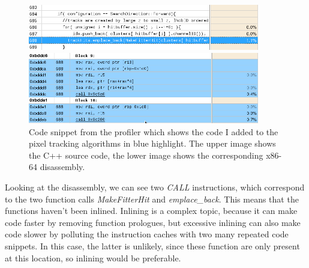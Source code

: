 \documentclass[12pt]{article}
\begin{document}
\begin{figure}[H]
	\begin{center}
		\includegraphics[width=0.9\textwidth]{kalmanfit_disasm_opt_src_naive}
	\end{center}
	\begin{center}
		\includegraphics[width=0.9\textwidth]{kalmanfit_disasm_opt_asm_naive}
	\end{center}
	\caption{Code snippet from the profiler which shows the code I added to the pixel tracking algorithms in blue highlight. The upper image shows the C++ source code, the lower image shows the corresponding x86-64 disassembly.}
	\label{fig_kalman_disasm_src_naive}
\end{figure}

Looking at the disassembly, we can see two \textit{CALL} instructions, which correspond to the two function calls \textit{MakeFitterHit} and \textit{emplace\_back}. This means that the functions haven't been inlined. Inlining is a complex topic, because it can make code faster by removing function prologues, but excessive inlining can also make code slower by polluting the instruction caches with two many repeated code snippets. In this case, the latter is unlikely, since these function are only present at this location, so inlining would be preferable.
\end{document}
